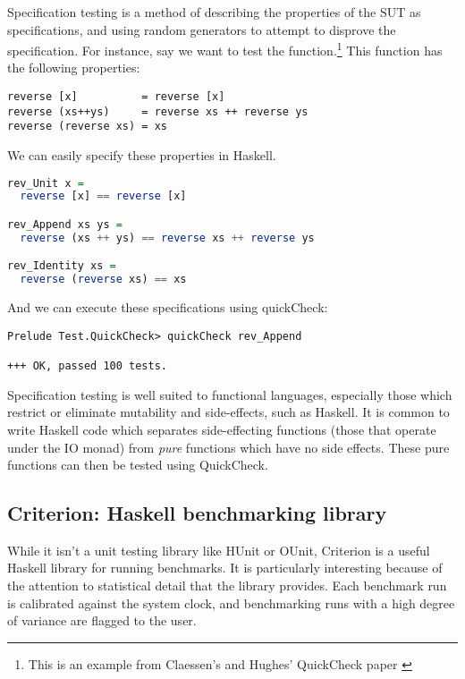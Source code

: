 Specification testing is a method of describing the properties of the
SUT as specifications, and using random generators to attempt to
disprove the specification. For instance, say we want to test the
 function.\footnote{This is an example from Claessen's
  and Hughes' QuickCheck paper \cite{claessen:quickcheck}} This
function has the following properties:

\footnotesize
\begin{verbatim}
reverse [x]          = reverse [x]
reverse (xs++ys)     = reverse xs ++ reverse ys
reverse (reverse xs) = xs
\end{verbatim}
\normalsize

We can easily specify these properties in Haskell.

\begin{lstlisting}[language=Haskell]
rev_Unit x =
  reverse [x] == reverse [x]

rev_Append xs ys =
  reverse (xs ++ ys) == reverse xs ++ reverse ys

rev_Identity xs =
  reverse (reverse xs) == xs
\end{lstlisting}

And we can execute these specifications using quickCheck:

\footnotesize
\begin{verbatim}
Prelude Test.QuickCheck> quickCheck rev_Append

+++ OK, passed 100 tests.
\end{verbatim}
\normalsize

Specification testing is well suited to functional languages,
especially those which restrict or eliminate mutability and
side-effects, such as Haskell. It is common to write Haskell code
which separates side-effecting functions (those that operate under the
IO monad) from \textit{pure} functions which have no side
effects. These pure functions can then be tested using QuickCheck. 

\subsection{Criterion: Haskell benchmarking library}

While it isn't a unit testing library like HUnit or OUnit, Criterion
\cite{www:criterion} is a useful Haskell library for running
benchmarks. It is particularly interesting because of the attention to
statistical detail that the library provides. Each benchmark run is
calibrated against the system clock, and benchmarking runs with a high
degree of variance are flagged to the user.


